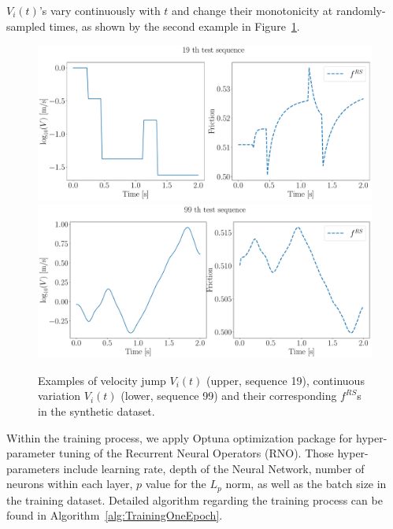 $V_i(t)$'s vary continuously with $t$ and change their monotonicity at randomly-sampled times, 
as shown by the second example in Figure~\ref{fig:19thAnd99thRS}. 
\begin{figure}
    \centering
    \includegraphics[height=0.3\textheight]{figures/19thRS.pdf}
    \includegraphics[height=0.3\textheight]{figures/99thRS.pdf}
    \caption{Examples of velocity jump $V_i(t)$ (upper, sequence 19), 
    continuous variation $V_i(t)$ (lower, sequence 99) and their corresponding $f^{RS}$s in the synthetic dataset.}
    \label{fig:19thAnd99thRS}
\end{figure}

Within the training process, 
we apply Optuna \cite{akiba2019optuna} optimization package for hyper-parameter tuning of the Recurrent Neural Operators (RNO). 
Those hyper-parameters include learning rate, 
depth of the Neural Network, 
number of neurons within each layer, 
$p$ value for the $L_p$ norm, 
as well as the batch size in the training dataset. 
Detailed algorithm regarding the training process can be found in Algorithm~\ref{alg:TrainingOneEpoch}. 

